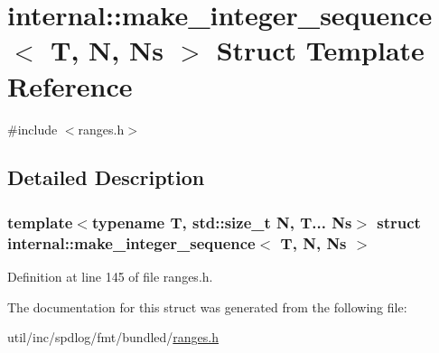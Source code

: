 \hypertarget{structinternal_1_1make__integer__sequence}{}\section{internal\+:\+:make\+\_\+integer\+\_\+sequence$<$ T, N, Ns $>$ Struct Template Reference}
\label{structinternal_1_1make__integer__sequence}


{\ttfamily \#include $<$ranges.\+h$>$}



\subsection{Detailed Description}
\subsubsection*{template$<$typename T, std\+::size\+\_\+t N, T... Ns$>$\newline
struct internal\+::make\+\_\+integer\+\_\+sequence$<$ T, N, Ns $>$}



Definition at line 145 of file ranges.\+h.



The documentation for this struct was generated from the following file\+:\begin{DoxyCompactItemize}
\item 
util/inc/spdlog/fmt/bundled/\hyperlink{ranges_8h}{ranges.\+h}\end{DoxyCompactItemize}
